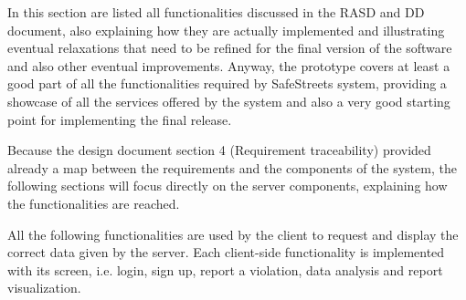 In this section are listed all functionalities discussed in the RASD and DD document, also explaining how they are actually implemented and illustrating eventual relaxations that need to be refined for the final version of the software and also other eventual improvements. Anyway, the prototype covers at least a good part of all the functionalities required by SafeStreets system, providing a showcase of all the services offered by the system and also a very good starting point for implementing the final release.

Because the design document section 4 (Requirement traceability) provided already a map between the requirements and the components of the system, the following sections will focus directly on the server components, explaining how the functionalities are reached.

All the following functionalities are used by the client to request and display the correct data given by the server. Each client-side functionality is implemented with its screen, i.e. login, sign up, report a violation, data analysis and report visualization.